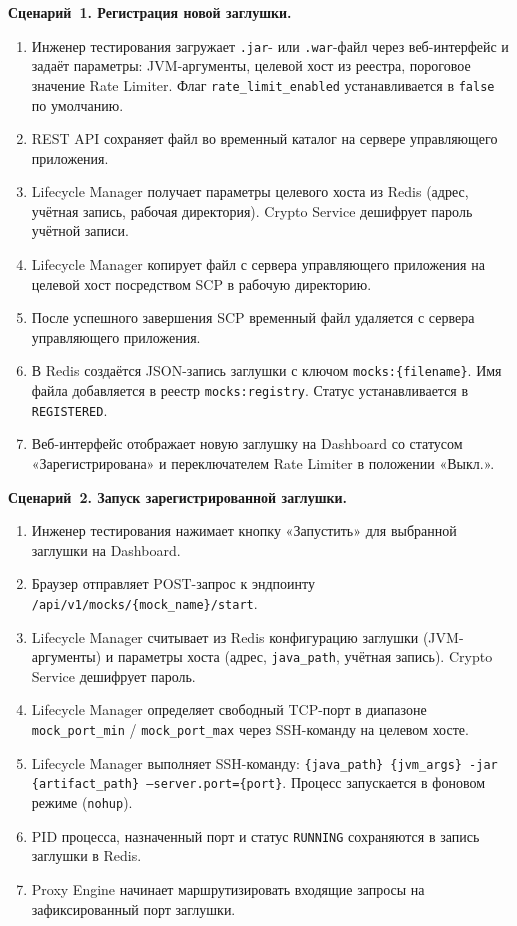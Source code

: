 \textbf{Сценарий~1. Регистрация новой заглушки.}

\begin{enumerate}
\item Инженер тестирования загружает \texttt{.jar}- или \texttt{.war}-файл через веб-интерфейс и задаёт параметры: JVM-аргументы, целевой хост из реестра, пороговое значение Rate Limiter. Флаг \texttt{rate\_limit\_enabled} устанавливается в \texttt{false} по умолчанию.
\item REST API сохраняет файл во временный каталог на сервере управляющего приложения.
\item Lifecycle Manager получает параметры целевого хоста из Redis (адрес, учётная запись, рабочая директория). Crypto Service дешифрует пароль учётной записи.
\item Lifecycle Manager копирует файл с сервера управляющего приложения на целевой хост посредством SCP в рабочую директорию.
\item После успешного завершения SCP временный файл удаляется с сервера управляющего приложения.
\item В Redis создаётся JSON-запись заглушки с ключом \texttt{mocks:\{filename\}}. Имя файла добавляется в реестр \texttt{mocks:registry}. Статус устанавливается в \texttt{REGISTERED}.
\item Веб-интерфейс отображает новую заглушку на Dashboard со статусом «Зарегистрирована» и переключателем Rate Limiter в положении «Выкл.».
\end{enumerate}

\textbf{Сценарий~2. Запуск зарегистрированной заглушки.}

\begin{enumerate}
\item Инженер тестирования нажимает кнопку «Запустить» для выбранной заглушки на Dashboard.
\item Браузер отправляет POST-запрос к эндпоинту \texttt{/api/v1/mocks/\{mock\_name\}/start}.
\item Lifecycle Manager считывает из Redis конфигурацию заглушки (JVM-аргументы) и параметры хоста (адрес, \texttt{java\_path}, учётная запись). Crypto Service дешифрует пароль.
\item Lifecycle Manager определяет свободный TCP-порт в диапазоне \texttt{mock\_port\_min} / \texttt{mock\_port\_max} через SSH-команду на целевом хосте.
\item Lifecycle Manager выполняет SSH-команду: \texttt{\{java\_path\} \{jvm\_args\} -jar \{artifact\_path\} --server.port=\{port\}}. Процесс запускается в фоновом режиме (\texttt{nohup}).
\item PID процесса, назначенный порт и статус \texttt{RUNNING} сохраняются в запись заглушки в Redis.
\item Proxy Engine начинает маршрутизировать входящие запросы на зафиксированный порт заглушки.
\end{enumerate}

